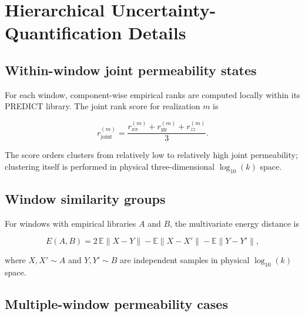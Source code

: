 
\section{Hierarchical Uncertainty-Quantification Details}
\label{sec:si-hierarchical-uq}

\subsection{Within-window joint permeability states}

For each window, component-wise empirical ranks are computed locally within its PREDICT library. The joint rank score for realization $m$ is

\begin{equation}
  r_{\mathrm{joint}}^{(m)} =
  \frac{r_{xx}^{(m)} + r_{yy}^{(m)} + r_{zz}^{(m)}}{3}.
  \label{eq:si-joint-rank-score}
\end{equation}

The score orders clusters from relatively low to relatively high joint permeability; clustering itself is performed in physical three-dimensional $\log_{10}(k)$ space. 

\subsection{Window similarity groups}

For windows with empirical libraries $A$ and $B$, the multivariate energy distance is

\begin{equation}
  E(A,B) = 2\,\mathbb{E}\lVert X-Y\rVert
  - \mathbb{E}\lVert X-X'\rVert
  - \mathbb{E}\lVert Y-Y'\rVert,
  \label{eq:si-energy-distance}
\end{equation}

where $X,X'\sim A$ and $Y,Y'\sim B$ are independent samples in physical $\log_{10}(k)$ space. 

\subsection{Multiple-window permeability cases}


